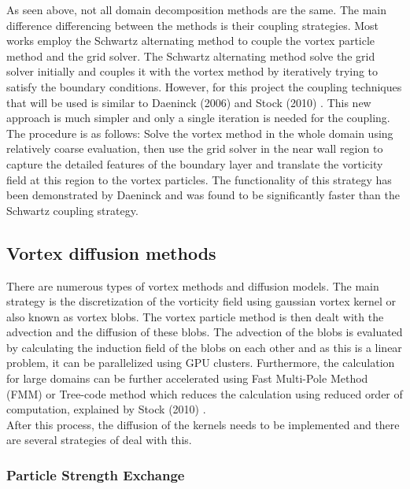 As seen above, not all domain decomposition methods are the same. The main difference differencing between the methods is their coupling strategies. Most works employ the Schwartz alternating method to couple the vortex particle method and the grid solver. The Schwartz alternating method solve the grid solver initially and couples it with the vortex method by iteratively trying to satisfy the boundary conditions. However, for this project the coupling techniques that will be used is similar to Daeninck (2006) \cite{Daeninck2006} and Stock (2010) \cite{Stock}. This new approach is much simpler and only a single iteration is needed for the coupling. The procedure is as follows: Solve the vortex method in the whole domain using relatively coarse evaluation, then use the grid solver in the near wall region to capture the detailed features of the boundary layer and translate the vorticity field at this region to the vortex particles. The functionality of this strategy has been demonstrated by Daeninck and was found to be significantly faster than the Schwartz coupling strategy.\\

\subsection{Vortex diffusion methods}

There are numerous types of vortex methods and diffusion models. The main strategy is the discretization of the vorticity field using gaussian vortex kernel or also known as vortex blobs. The vortex particle method is then dealt with the advection and the diffusion of these blobs. The advection of the blobs is evaluated by calculating the induction field of the blobs on each other and as this is a linear problem, it can be parallelized using GPU clusters. Furthermore, the calculation for large domains can be further accelerated using Fast Multi-Pole Method (FMM) or Tree-code method which reduces the calculation using reduced order of computation, explained by Stock (2010) \cite{Stock}.\\

After this process, the diffusion of the kernels needs to be implemented and there are several strategies of deal with this.\\

\subsubsection*{Particle Strength Exchange}

